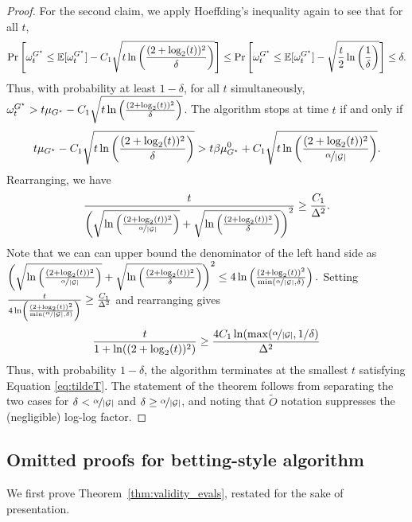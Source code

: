\begin{proof}
For the second claim, we apply Hoeffding's inequality again to see that for all $t$,  
\[
\Pr\left[\omega_t^{G^\star} \leq \mathbb{E}[\omega_t^{G^\star}] - C_1  \sqrt{ t \ln\left(\frac{(2 + \log_2(t))^2}{\delta}\right)}\right] \leq \Pr\left[\omega_t^{G^\star} \leq \mathbb{E}[\omega_t^{G^\star}] - \sqrt{\frac t2 \ln\left(\frac{ 1}{\delta}\right)}\right] \leq \delta.
\]
Thus, with probability at least $1-\delta$, for all $t$ simultaneously, $\omega_t^{G^\star} > t\mu_{G^\star} - C_1  \sqrt{ t \ln\left(\frac{(2 + \log_2(t))^2}{\delta}\right)}$. 
The algorithm stops at time $t$ if and only if 
\[
t \mu_{G^\star} - C_1  \sqrt{ t \ln\left(\frac{(2 + \log_2(t))^2}{\delta}\right)} > t \beta{\mu_{{G^\star}}^0} + C_1  \sqrt{ t \ln\left(\frac{(2 + \log_2(t))^2}{{\nicefrac{\alpha}{|{\mathcal{G}}|}}}\right)}. 
\]
Rearranging, we have 
\[
\frac{t}{\left(\sqrt{\ln\left(\frac{(2 + \log_2(t))^2}{{\nicefrac{\alpha}{|{\mathcal{G}}|}}}\right)} + \sqrt{\ln\left(\frac{(2 + \log_2(t))^2}{\delta}\right)}\right)^2} \geq \frac{C_1}{\Delta^2}.
\]
Note that we can can upper bound the denominator of the left hand side as 
$    \left(\sqrt{\ln\left(\frac{(2 + \log_2(t))^2}{{\nicefrac{\alpha}{|{\mathcal{G}}|}}}\right)} + \sqrt{\ln\left(\frac{(2 + \log_2(t))^2}{\delta}\right)}\right)^2 \leq 4 \ln\left(\frac{(2 + \log_2(t))^2}{\min({\nicefrac{\alpha}{|{\mathcal{G}}|}}, \delta)}\right). $
Setting $\frac{t}{4 \ln\left(\frac{(2 + \log_2(t))^2}{\min({\nicefrac{\alpha}{|{\mathcal{G}}|}}, \delta)}\right)} \geq \frac{C_1}{\Delta^2}$ and rearranging gives 
\begin{align}
\label{eq:tildeT}
\frac{t}{1 + \ln((2 + \log_2(t))^2)} \geq \frac{4C_1\ln(\max({\nicefrac{\alpha}{|{\mathcal{G}}|}}, 1/\delta)}{\Delta^2}  
\end{align}
Thus, with probability $1-\delta$, the algorithm terminates at the smallest $t$ satisfying Equation \eqref{eq:tildeT}. The statement of the theorem follows from separating the two cases for $\delta < {\nicefrac{\alpha}{|{\mathcal{G}}|}}$ and $\delta \geq {\nicefrac{\alpha}{|{\mathcal{G}}|}}$, and noting that $\widetilde{O}$ notation suppresses the (negligible) log-log factor. 
\end{proof}

\subsection{Omitted proofs for betting-style algorithm}
\label{app:eval}

We first prove Theorem~\ref{thm:validity_evals}, restated for the sake of presentation.
\evalsvalidity*


